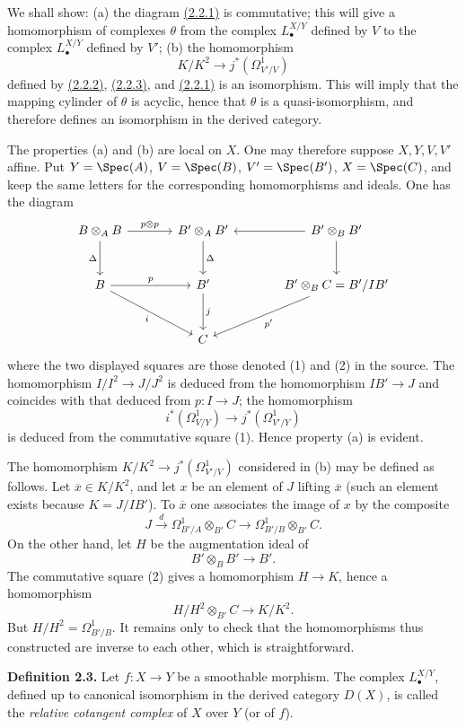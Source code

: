 We shall show: (a) the diagram \hyperlink{sga6.e08.eq.2-2-1}{(2.2.1)} is commutative; this will give a homomorphism of complexes $\theta$ from the complex $L^{X/Y}_\bullet$ defined by $V$ to the complex $L^{X/Y}_\bullet$ defined by $V'$; (b) the homomorphism
\[
K/K^2\longrightarrow j^*(\Omega^1_{V'/V})
\]
defined by \hyperlink{sga6.e08.eq.2-2-2}{(2.2.2)}, \hyperlink{sga6.e08.eq.2-2-3}{(2.2.3)}, and \hyperlink{sga6.e08.eq.2-2-1}{(2.2.1)} is an isomorphism. This will imply that the mapping cylinder of $\theta$ is acyclic, hence that $\theta$ is a quasi-isomorphism, and therefore defines an isomorphism in the derived category.

The properties (a) and (b) are local on $X$. One may therefore suppose $X,Y,V,V'$ affine. Put $Y=\Spec(A)$, $V=\Spec(B)$, $V'=\Spec(B')$, $X=\Spec(C)$, and keep the same letters for the corresponding homomorphisms and ideals. One has the diagram
\[
\begin{tikzcd}[column sep=large,row sep=large]
B\otimes_A B \arrow[r,"p\otimes p"] \arrow[d,"\Delta"'] & B'\otimes_A B' \arrow[d,"\Delta"] & B'\otimes_B B' \arrow[l] \arrow[d]\\
B \arrow[r,"p"] \arrow[dr,"i"'] & B' \arrow[d,"j"] & B'\otimes_B C = B'/IB' \arrow[dl,"p'" ]\\
{} & C & {}
\end{tikzcd}
\]
where the two displayed squares are those denoted (1) and (2) in the source.
The homomorphism $I/I^2\to J/J^2$ is deduced from the homomorphism $IB'\to J$ and coincides with that deduced from $p:I\to J$; the homomorphism
\[
i^*(\Omega^1_{V/Y})\longrightarrow j^*(\Omega^1_{V'/Y})
\]
is deduced from the commutative square (1). Hence property (a) is evident.

The homomorphism $K/K^2\to j^*(\Omega^1_{V'/V})$ considered in (b) may be defined as follows. Let $\overline x\in K/K^2$, and let $x$ be an element of $J$ lifting $\overline x$ (such an element exists because $K=J/IB'$). To $\overline x$ one associates the image of $x$ by the composite
\[
J\xrightarrow{d}\Omega^1_{B'/A}\otimes_{B'}C
\longrightarrow\Omega^1_{B'/B}\otimes_{B'}C.
\]
On the other hand, let $H$ be the augmentation ideal of
\[
B'\otimes_B B'\longrightarrow B'.
\]
The commutative square (2) gives a homomorphism $H\to K$, hence a homomorphism
\[
H/H^2\otimes_{B'}C\longrightarrow K/K^2.
\]
But $H/H^2=\Omega^1_{B'/B}$. It remains only to check that the homomorphisms thus constructed are inverse to each other, which is straightforward.

\textbf{Definition 2.3.} Let $f:X\to Y$ be a smoothable morphism. The complex $L^{X/Y}_\bullet$, defined up to canonical isomorphism in the derived category $D(X)$, is called the \emph{relative cotangent complex} of $X$ over $Y$ (or of $f$).


